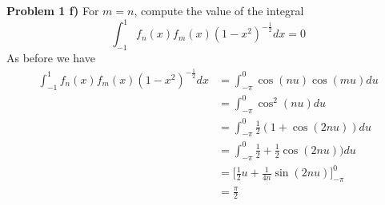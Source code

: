 \documentclass[12pt]{article}
\newcommand{\problem}[1]{\hspace{-4 ex} \large \textbf{Problem #1} }
\begin{document}
\problem{1 f)} For $m=n$, compute the value of the integral
	$$
	\int_{-1}^{1} f_n(x)f_m(x)(1-x^2)^{-\tfrac{1}{2}} dx = 0
	$$
	As before we have 
	\begin{align*}
		\int_{-1}^{1} f_n(x)f_m(x)(1-x^2)^{-\tfrac{1}{2}} dx & = \int_{-\pi}^{0} \cos(nu)\cos(mu) du \\
		& = \int_{-\pi}^{0} \cos^2(nu)du \\
		& = \int_{-\pi}^{0} \tfrac{1}{2}(1+\cos(2nu))du \\
		& = \int_{-\pi}^{0} \tfrac{1}{2} + \tfrac{1}{2}\cos(2nu))du \\
		& = \Big[ \tfrac{1}{2}u + \tfrac{1}{4n}\sin(2nu) \Big]_{-\pi}^{0} \\
		& = \tfrac{\pi}{2}
	\end{align*}
	
\end{document}
